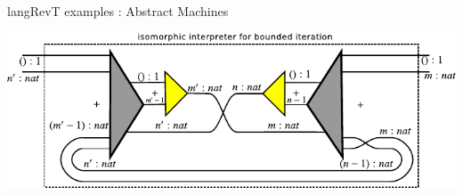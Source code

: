 \documentclass[svgnames,11pt]{beamer}
\begin{document}
\begin{frame}{ {{langRevT}} examples : Abstract Machines}

  \begin{multicols}{2}
    

  \end{multicols}


\vfill

\begin{center}
  \includegraphics{iso-int/diagrams/nat-nat8.pdf}
\end{center}

  
\vfill

\end{frame}
\end{document}
